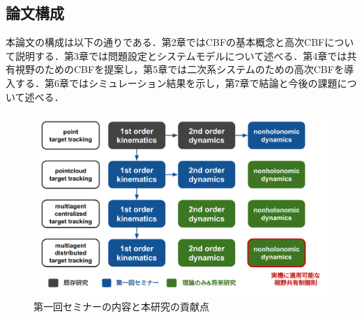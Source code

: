 \subsection{論文構成}

本論文の構成は以下の通りである．第2章ではCBFの基本概念と高次CBFについて説明する．第3章では問題設定とシステムモデルについて述べる．第4章では共有視野のためのCBFを提案し，第5章では二次系システムのための高次CBFを導入する．第6章ではシミュレーション結果を示し，第7章で結論と今後の課題について述べる．

\begin{figure}[htbp]
\centering
\includegraphics[width=0.8\linewidth]{fig/progress.png}
\caption{第一回セミナーの内容と本研究の貢献点}
\label{fig:progress}
\end{figure}